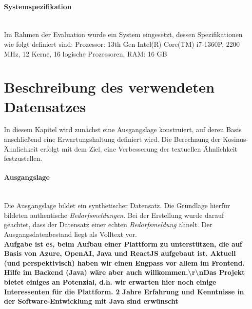 \paragraph{Systemspezifikation}\mbox{}\\
Im Rahmen der Evaluation wurde ein System eingesetzt, dessen Spezifikationen wie folgt definiert sind: Prozessor: 13th Gen Intel(R) Core(TM) i7-1360P, 2200 MHz, 12 Kerne, 16 logische Prozessoren, RAM: 16 GB\\
\section{Beschreibung des verwendeten Datensatzes}
In diesem Kapitel wird zunächst eine Ausgangslage konstruiert, auf deren Basis anschließend eine Erwartungshaltung definiert wird. Die Berechnung der Kosinus-Ähnlichkeit erfolgt mit dem Ziel, eine Verbesserung der textuellen Ähnlichkeit festzustellen.
\paragraph{Ausgangslage}\mbox{}\\
Die Ausgangslage bildet ein synthetischer Datensatz. Die Grundlage hierfür bildeten authentische \emph{Bedarfsmeldungen}. Bei der Erstellung wurde darauf geachtet, dass der Datensatz einer echten \emph{Bedarfsmeldung} ähnelt. Der Ausgangsdatenbestand liegt als Volltext vor.\\

\textbf{Aufgabe ist es, beim Aufbau einer Plattform zu unterstützen, die auf Basis von Azure, OpenAI, Java und ReactJS aufgebaut ist. Aktuell (und perspektivisch) haben wir einen Engpass vor allem im Frontend. Hilfe im Backend (Java) wäre aber auch willkommen.\textbackslash r\textbackslash nDas Projekt bietet einiges an Potenzial, d.h. wir erwarten hier noch einige Interessenten für die Plattform. 2 Jahre Erfahrung und Kenntnisse in der Software-Entwicklung mit Java sind erwünscht}\\

